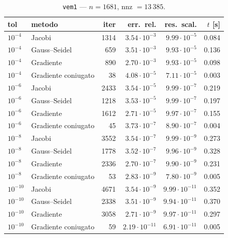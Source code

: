 \documentclass[11pt,a4paper]{article}
\begin{document}
\begin{table}[h]
\centering
\caption{\texttt{vem1} --- $n=1681$, nnz $=13\,385$.}
\begin{tabular}{l l r r r r}
\toprule
tol & metodo & iter & err.\ rel. & res.\ scal. & $t$ [s] \\
\midrule
$10^{-4}$  & Jacobi              & 1314 & $3.54\cdot10^{-3}$ & $9.99\cdot10^{-5}$ & 0.084 \\
$10^{-4}$  & Gauss--Seidel       & 659  & $3.51\cdot10^{-3}$ & $9.93\cdot10^{-5}$ & 0.136 \\
$10^{-4}$  & Gradiente           & 890  & $2.70\cdot10^{-3}$ & $9.93\cdot10^{-5}$ & 0.098 \\
$10^{-4}$  & Gradiente coniugato & 38   & $4.08\cdot10^{-5}$ & $7.11\cdot10^{-5}$ & 0.003 \\
\midrule
$10^{-6}$  & Jacobi              & 2433 & $3.54\cdot10^{-5}$ & $9.99\cdot10^{-7}$ & 0.219 \\
$10^{-6}$  & Gauss--Seidel       & 1218 & $3.53\cdot10^{-5}$ & $9.99\cdot10^{-7}$ & 0.197 \\
$10^{-6}$  & Gradiente           & 1612 & $2.71\cdot10^{-5}$ & $9.97\cdot10^{-7}$ & 0.155 \\
$10^{-6}$  & Gradiente coniugato & 45   & $3.73\cdot10^{-7}$ & $8.90\cdot10^{-7}$ & 0.004 \\
\midrule
$10^{-8}$  & Jacobi              & 3552 & $3.54\cdot10^{-7}$ & $9.99\cdot10^{-9}$ & 0.273 \\
$10^{-8}$  & Gauss--Seidel       & 1778 & $3.52\cdot10^{-7}$ & $9.96\cdot10^{-9}$ & 0.328 \\
$10^{-8}$  & Gradiente           & 2336 & $2.70\cdot10^{-7}$ & $9.90\cdot10^{-9}$ & 0.231 \\
$10^{-8}$  & Gradiente coniugato & 53   & $2.83\cdot10^{-9}$ & $7.80\cdot10^{-9}$ & 0.005 \\
\midrule
$10^{-10}$ & Jacobi              & 4671 & $3.54\cdot10^{-9}$  & $9.99\cdot10^{-11}$ & 0.352 \\
$10^{-10}$ & Gauss--Seidel       & 2338 & $3.51\cdot10^{-9}$  & $9.94\cdot10^{-11}$ & 0.370 \\
$10^{-10}$ & Gradiente           & 3058 & $2.71\cdot10^{-9}$  & $9.97\cdot10^{-11}$ & 0.297 \\
$10^{-10}$ & Gradiente coniugato & 59   & $2.19\cdot10^{-11}$ & $6.91\cdot10^{-11}$ & 0.005 \\
\bottomrule
\end{tabular}
\end{table}
\end{document}
